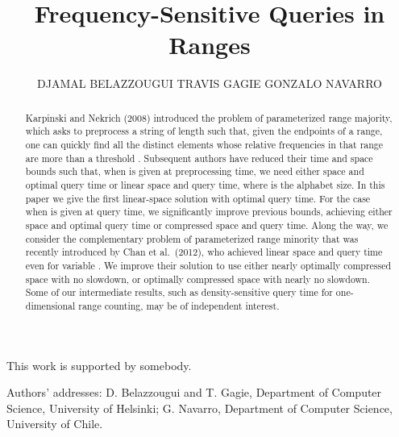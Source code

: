 \documentclass[prodmode,acmtalg]{acmsmall}
\begin{document}

\title{Frequency-Sensitive Queries in Ranges}
\author{DJAMAL BELAZZOUGUI 
    TRAVIS GAGIE 
    GONZALO NAVARRO }

\begin{abstract}
Karpinski and Nekrich (2008) introduced the problem of parameterized range majority, which asks to preprocess a string of length  such that, given the endpoints of a range, one can quickly find all the distinct elements whose relative frequencies in that range are more than a threshold .  Subsequent authors have reduced their time and space bounds such that, when  is given at preprocessing time, we need either  space and optimal  query time or linear space and  query time, where  is the alphabet size.  In this paper we give the first linear-space solution with optimal  query time.  For the case when  is given at query time, we significantly improve previous bounds, achieving either  space and optimal  query time or compressed space and  query time.  Along the way, we consider the complementary 
problem of parameterized range minority that was recently introduced by Chan et al.\ (2012), who achieved linear space and  query time even for variable .  We improve their solution to use either nearly optimally compressed space with no slowdown, or optimally compressed space with nearly no slowdown.  Some of our intermediate results, such as density-sensitive query time for one-dimensional range counting, may be of independent interest.
\end{abstract}





\begin{bottomstuff}
This work is supported by somebody.

Authors' addresses: D. Belazzougui and T. Gagie, Department of Computer Science, University of Helsinki; G. Navarro, Department of Computer Science, University of Chile.
\end{bottomstuff}
\end{document}
